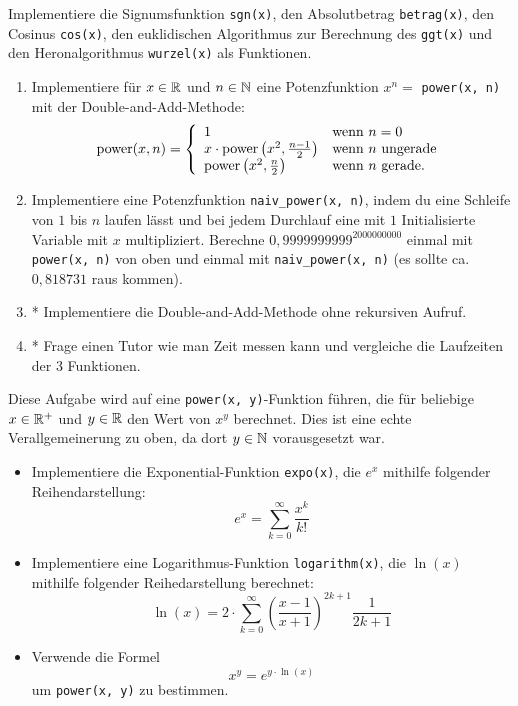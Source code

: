 \documentclass{uebungszettel}
\begin{document}
\begin{aufg}
Implementiere die Signumsfunktion \verb|sgn(x)|, den Absolutbetrag \verb|betrag(x)|, den Cosinus \verb|cos(x)|, den 
euklidischen Algorithmus zur Berechnung des \verb|ggt(x)| und den Heronalgorithmus \verb|wurzel(x)| als Funktionen.
\end{aufg}

\begin{aufg}
\begin{enumerate}[leftmargin=*]
\item Implementiere für $x \in \mathbb{R}$ und $n \in \mathbb{N}$ eine Potenzfunktion $x^n=$ \verb|power(x, n)| mit der Double-and-Add-Methode: \[
	\mathrm{power}(x, n) = \left\{ \begin{array}{ll}
	1 & \text{wenn } n = 0 \\
	x \cdot \mathrm{power}\left(x^2, \frac{n-1}{2}\right) & \text{wenn } n \text{ ungerade} \\
	\mathrm{power}\left(x^2, \frac{n}{2}\right) & \text{wenn } n \text{ gerade.} \\
	\end{array}
	\right.
\]
\item Implementiere eine Potenzfunktion \verb|naiv_power(x, n)|, indem du eine Schleife von $1$ bis $n$ laufen lässt 
und bei jedem Durchlauf eine mit $1$ Initialisierte Variable mit $x$ multipliziert. Berechne 
$0,9999999999^{2000000000}$ einmal mit \verb|power(x, n)| von oben und einmal mit \verb|naiv_power(x, n)| (es sollte 
ca. $0,818731$ raus kommen). 
\item* Implementiere die Double-and-Add-Methode ohne rekursiven Aufruf.
\item* Frage einen Tutor wie man Zeit messen kann und vergleiche die Laufzeiten der 3 Funktionen.
\end{enumerate}
\end{aufg}

\begin{aufg}
Diese Aufgabe wird auf eine \verb|power(x, y)|-Funktion führen, die für beliebige $x \in \mathbb{R}^+$ und $y \in \mathbb{R}$ den Wert 
von $x^y$ berechnet. Dies ist eine echte Verallgemeinerung zu oben, da dort $y\in \mathbb{N}$ vorausgesetzt war.
\begin{itemize}
\item Implementiere die Exponential-Funktion \verb|expo(x)|, die $e^x$ mithilfe folgender Reihendarstellung: \[
e^x = \sum_{k=0}^\infty \frac{x^k}{k!} \]
\item Implementiere eine Logarithmus-Funktion \verb|logarithm(x)|, die $\ln(x)$ mithilfe folgender Reihedarstellung 
berechnet: \[
\ln(x) = 2\cdot \sum_{k = 0}^\infty \left(\frac{x-1}{x+1}\right)^{2k + 1} \frac{1}{2k + 1} \]
\item Verwende die Formel \[
x^y = e^{y \cdot \ln(x)} \] um \verb|power(x, y)| zu bestimmen.
\end{itemize}
\end{aufg}
\end{document}
